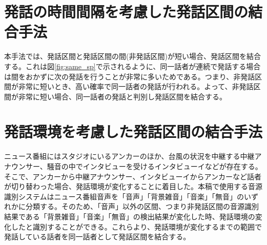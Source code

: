 \section{発話の時間間隔を考慮した発話区間の結合手法}
本手法では、発話区間と発話区間の間(非発話区間)が短い場合、発話区間を結合する。これは図\ref{fig:same_sp}で示されるように、同一話者が連続で発話する場合は間をおかずに次の発話を行うことが非常に多いためである。つまり、非発話区間が非常に短いとき、高い確率で同一話者の発話が行われる。よって、非発話区間が非常に短い場合、同一話者の発話と判別し発話区間を結合する。

\section{発話環境を考慮した発話区間の結合手法}
ニュース番組にはスタジオにいるアンカーのほか、台風の状況を中継する中継アナウンサー、騒音の中でインタビューを受けるインタビューイなどが存在する。そこで、アンカーから中継アナウンサー、インタビューイからアンカーなど話者が切り替わった場合、発話環境が変化することに着目した。本稿で使用する音源識別システムはニュース番組音声を「音声」「背景雑音」「音楽」「無音」のいずれかに分類する。そのため、「音声」以外の区間、つまり非発話区間の音源識別結果である「背景雑音」「音楽」「無音」の検出結果が変化した時、発話環境の変化したと識別することができる。これらより、発話環境が変化するまでの範囲で発話している話者を同一話者として発話区間を結合する。\par
